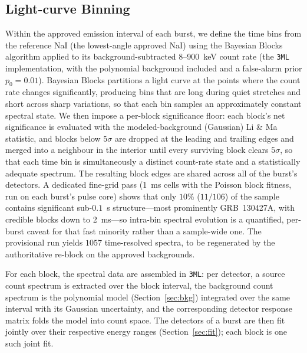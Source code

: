 \subsection{Light-curve Binning} \label{sec:bin}
Within the approved emission interval of each burst, we define the time bins
from the reference NaI (the lowest-angle approved NaI) using the Bayesian Blocks
algorithm \citep{Scargle2013} applied to its background-subtracted 8--900~keV
count rate (the \texttt{3ML} implementation, with the polynomial background
included and a false-alarm prior $p_0=0.01$). Bayesian Blocks partitions a light
curve at the points where the count rate changes significantly, producing bins
that are long during quiet stretches and short across sharp variations, so that
each bin samples an approximately constant spectral state. We then impose a
per-block significance floor: each block's net significance is evaluated with
the modeled-background (Gaussian) Li \& Ma statistic, and blocks below $5\sigma$
are dropped at the leading and trailing edges and merged into a neighbour in the
interior until every surviving block clears $5\sigma$, so that each time bin is
simultaneously a distinct count-rate state and a statistically adequate
spectrum. The resulting block edges are shared across all of the burst's
detectors. A dedicated fine-grid pass (1~ms cells with the Poisson block
fitness, run on each burst's pulse core) shows that only $10\%$ ($11/106$) of
the sample contains significant sub-$0.1$~s structure---most prominently
GRB~130427A, with credible blocks down to 2~ms---so intra-bin spectral evolution
is a quantified, per-burst caveat for that fast minority rather than a
sample-wide one. The provisional run yields \textbf{$1057$} time-resolved
spectra, to be regenerated by the authoritative re-block on the approved
backgrounds.

For each block, the spectral data are assembled in \texttt{3ML}: per detector, a
source count spectrum is extracted over the block interval, the background count
spectrum is the polynomial model (Section~\ref{sec:bkg}) integrated over the same
interval with its Gaussian uncertainty, and the corresponding detector response
matrix folds the model into count space. The detectors of a burst are then fit
jointly over their respective energy ranges (Section~\ref{sec:fit}); each block
is one such joint fit.

